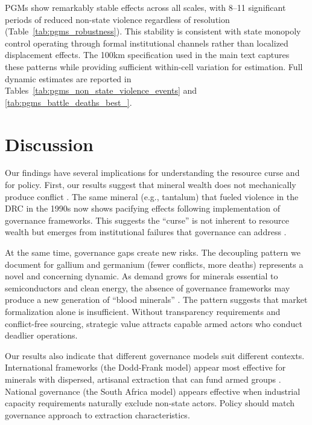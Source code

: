 \documentclass[11pt]{article}
\begin{document}
PGMs show remarkably stable effects across all scales, with 8--11 significant periods of reduced non-state violence regardless of resolution (Table~\ref{tab:pgms_robustness}). This stability is consistent with state monopoly control operating through formal institutional channels rather than localized displacement effects. The 100km specification used in the main text captures these patterns while providing sufficient within-cell variation for estimation. Full dynamic estimates are reported in Tables~\ref{tab:pgms_non_state_violence_events} and \ref{tab:pgms_battle_deaths_best_}.



\section{Discussion}

Our findings have several implications for understanding the resource curse and for policy. First, our results suggest that mineral wealth does not mechanically produce conflict \citep{ross2015resource, gilmore2005resource}. The same mineral (e.g., tantalum) that fueled violence in the DRC in the 1990s now shows pacifying effects following implementation of governance frameworks. This suggests the ``curse'' is not inherent to resource wealth but emerges from institutional failures that governance can address \citep{mehlum2006institutions, robinson2006governance}.

At the same time, governance gaps create new risks. The decoupling pattern we document for gallium and germanium (fewer conflicts, more deaths) represents a novel and concerning dynamic. As demand grows for minerals essential to semiconductors and clean energy, the absence of governance frameworks may produce a new generation of ``blood minerals'' \citep{enough2009conflict}. The pattern suggests that market formalization alone is insufficient. Without transparency requirements and conflict-free sourcing, strategic value attracts capable armed actors who conduct deadlier operations.

Our results also indicate that different governance models suit different contexts. International frameworks (the Dodd-Frank model) appear most effective for minerals with dispersed, artisanal extraction that can fund armed groups \citep{radley2021artisanal}. National governance (the South Africa model) appears effective when industrial capacity requirements naturally exclude non-state actors. Policy should match governance approach to extraction characteristics.
\end{document}
